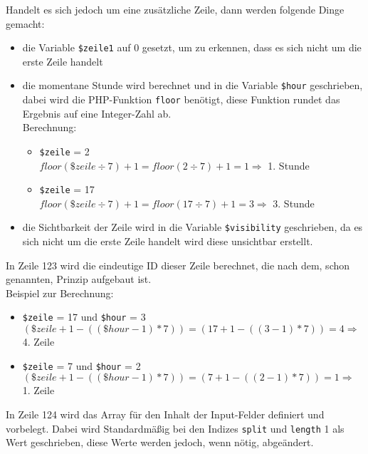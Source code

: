 \begin{enumerate}
	Handelt es sich jedoch um eine zusätzliche Zeile, dann werden folgende Dinge gemacht:
	
	\begin{itemize}
		\item die Variable \texttt{\$zeile1} auf 0 gesetzt, um zu erkennen, dass es sich nicht um die erste Zeile handelt
		\item die momentane Stunde wird berechnet und in die Variable \texttt{\$hour} geschrieben, dabei wird die PHP-Funktion \texttt{floor} benötigt, diese Funktion rundet das Ergebnis auf eine Integer-Zahl ab.\\
		Berechnung:
		
		\begin{itemize}
			\item \texttt{\$zeile} = 2\\
			$ floor(\$zeile \div 7) + 1 = floor( 2 \div 7 ) + 1 = 1 \Rightarrow $ 1. Stunde
			\item \texttt{\$zeile} = 17\\
			$ floor(\$zeile \div 7) + 1 = floor( 17 \div 7 ) + 1 = 3 \Rightarrow $ 3. Stunde\\
		\end{itemize}
		
		\item die Sichtbarkeit der Zeile wird in die Variable \texttt{\$visibility} geschrieben, da es sich nicht um die erste Zeile handelt wird diese unsichtbar erstellt.
	\end{itemize}
	
	In Zeile 123 wird die eindeutige ID dieser Zeile berechnet, die nach dem, schon genannten, Prinzip aufgebaut ist.\\
	Beispiel zur Berechnung:
	
	\begin{itemize}
		\item \texttt{\$zeile} = 17 und \texttt{\$hour} = 3\\
		$ (\$zeile + 1 - ((\$hour - 1 ) \ast 7)) =  (17 + 1 - ((3 - 1) \ast 7)) = 4 \Rightarrow $ 4. Zeile
		\item \texttt{\$zeile} = 7 und \texttt{\$hour} = 2\\
		$ (\$zeile + 1 - ((\$hour - 1 ) \ast 7)) =  (7 + 1 - ((2 - 1) \ast 7)) = 1 \Rightarrow $ 1. Zeile
	\end{itemize}
	
	In Zeile 124 wird das Array für den Inhalt der Input-Felder definiert und vorbelegt. Dabei wird Standardmäßig bei den Indizes \texttt{split} und \texttt{length} 1 als Wert geschrieben, diese Werte werden jedoch, wenn nötig, abgeändert.\\
	

\end{enumerate}

